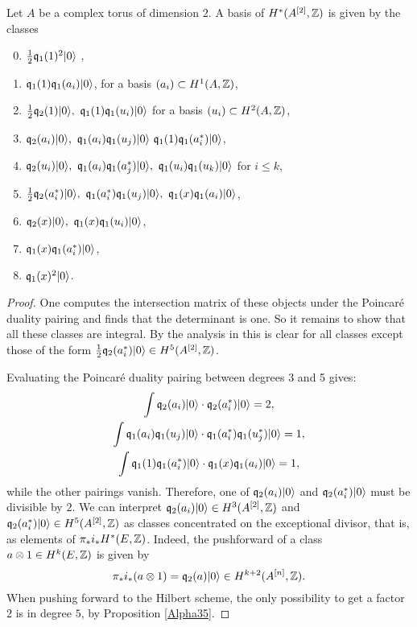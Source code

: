 \begin{proposition} \label{A2Basis}
 Let $A$ be a complex torus of dimension $2$. A basis of $H^*(A^{[2]},\mathbb{Z})$ is given by the classes 
 \begin{enumerate}\setcounter{enumi}{-1}
  \item $\frac{1}{2}\mathfrak{q}_1(1)^2|0\rangle$ ,
  \item $\mathfrak{q}_1(1)\mathfrak{q}_1(a_i)|0\rangle$, for a basis $(a_i)\subset H^1(A,\mathbb{Z})$,
  \item $\frac{1}{2}\q_2(1)\vac,\ \q_1(1)\q_1(u_i)\vac$ for a basis $(u_i)\subset H^2(A,\mathbb{Z})$,
  \item $\q_2(a_i)\vac, \ \q_1(a_i)\q_1(u_j)\vac\ \q_1(1)\q_1(a^*_i)\vac$,
  \item $\q_2(u_i)\vac, \ \q_1(a_i)\q_1(a^*_j)\vac,\ \q_1(u_i)\q_1(u_k)\vac$ for $i\leq k$,
  \item $\frac{1}{2}\q_2(a^*_i)\vac, \ \q_1(a^*_i)\q_1(u_j)\vac,\ \q_1(x)\q_1(a_i)\vac$,
  \item $\q_2(x)\vac,\ \q_1(x)\q_1(u_i)\vac$,
  \item $\mathfrak{q}_1(x)\mathfrak{q}_1(a^*_i)|0\rangle$, 
  \item $\mathfrak{q}_1(x)^2|0\rangle$.
 \end{enumerate}
\begin{proof}
One computes the intersection matrix of these objects under the Poincar\'e duality pairing and finds that the determinant is one. 
So it remains to show that all these classes are integral. By the analysis in \cite{QinWang} this is clear for all classes except 
those of the form $\frac{1}{2}\mathfrak{q}_2(a^*_i)|0\rangle \in H^5(A^{[2]},\mathbb{Z})$.

Evaluating the Poincar\'e duality pairing between degrees 3 and 5 gives:
\begin{gather*}
 \int \mathfrak{q}_2(a_i)|0\rangle \cdot \mathfrak{q}_2(a^*_i)|0\rangle = 2, \\
 \int \mathfrak{q}_1(a_i)\mathfrak{q}_1(u_j)|0\rangle \cdot  \mathfrak{q}_1(a^*_i)\mathfrak{q}_1(u^*_j)|0\rangle = 1, \\
 \int \mathfrak{q}_1(1)\mathfrak{q}_1(a^*_i)|0\rangle \cdot \mathfrak{q}_1(x)\mathfrak{q}_1(a_i)|0\rangle = 1,
\end{gather*}
while the other pairings vanish. Therefore, one of $\mathfrak{q}_2(a_i)|0\rangle$ and $\mathfrak{q}_2(a^*_i)|0\rangle$ must be divisible by $2$. 
We can interpret $\mathfrak{q}_2(a_i)|0\rangle\in H^3(A^{[2]},\mathbb{Z})$ and $\mathfrak{q}_2(a^*_i)|0\rangle\in H^5(A^{[2]},\mathbb{Z})$ as classes concentrated on the exceptional divisor, that is, as elements of $\pi_* i_*H^*(E,\mathbb{Z})$. Indeed,
the pushforward of a class $a\otimes 1 \in H^{k}(E,\mathbb{Z})$ is given by 
$$
\pi_* i_*(a\otimes 1) = \mathfrak{q}_2(a)|0\rangle \in H^{k+2}(A^{[n]},\mathbb{Z}).
$$
When pushing forward to the Hilbert scheme, the only possibility to get a factor $2$ is in degree $5$, by Proposition \ref{Alpha35}. 
\end{proof}

\end{proposition}
